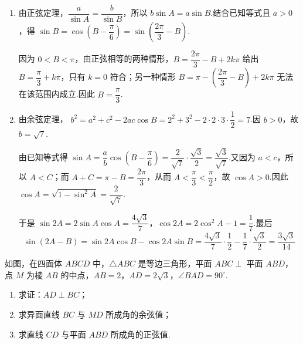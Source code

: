\begin{solution}
\begin{enumerate}
\item 由正弦定理，\(\dfrac{a}{\sin A}=\dfrac{b}{\sin B}\)，所以 \(b\sin A=a\sin B\).结合已知等式且 \(a>0\)，得
\(\sin B=\cos\!\left(B-\dfrac{\pi}{6}\right)=\sin\!\left(\dfrac{2\pi}{3}-B\right)\).

因为 \(0<B<\pi\)，由正弦相等的两种情形，\(B=\dfrac{2\pi}{3}-B+2k\pi\) 给出 \(B=\dfrac{\pi}{3}+k\pi\)，只有 \(k=0\) 符合；另一种情形 \(B=\pi-\left(\dfrac{2\pi}{3}-B\right)+2k\pi\) 无法在该范围内成立.因此 \(B=\dfrac{\pi}{3}\).

\item 由余弦定理，
\(b^2=a^2+c^2-2ac\cos B=2^2+3^2-2\cdot2\cdot3\cdot\dfrac12=7\).因 \(b>0\)，故 \(b=\sqrt7\).

由已知等式得
\(\sin A=\dfrac{a}{b}\cos\!\left(B-\dfrac{\pi}{6}\right)=\dfrac{2}{\sqrt7}\cdot\dfrac{\sqrt3}{2}=\dfrac{\sqrt3}{\sqrt7}\).又因为 \(a<c\)，所以 \(A<C\)；而 \(A+C=\pi-B=\dfrac{2\pi}{3}\)，从而 \(A<\dfrac{\pi}{3}<\dfrac{\pi}{2}\)，故 \(\cos A>0\).因此
\(\cos A=\sqrt{1-\sin^2A}=\dfrac{2}{\sqrt7}\).

于是 \(\sin2A=2\sin A\cos A=\dfrac{4\sqrt3}{7}\)，\(\cos2A=2\cos^2A-1=\dfrac17\).最后
\[
\sin(2A-B)=\sin2A\cos B-\cos2A\sin B=\frac{4\sqrt3}{7}\cdot\frac12-\frac17\cdot\frac{\sqrt3}{2}=\frac{3\sqrt3}{14}
\]
\end{enumerate}
\end{solution}

\begin{problem}

如图，在四面体 \(ABCD\) 中，\(\triangle ABC\) 是等边三角形，平面 \(ABC\perp\) 平面 \(ABD\)，点 \(M\) 为棱 \(AB\) 的中点，\(AB=2\)，\(AD=2\sqrt3\)，\(\angle BAD=90^\circ\).

\begin{enumerate}
\item 求证：\(AD\perp BC\)；
\item 求异面直线 \(BC\) 与 \(MD\) 所成角的余弦值；
\item 求直线 \(CD\) 与平面 \(ABD\) 所成角的正弦值.
\end{enumerate}

\end{problem}

